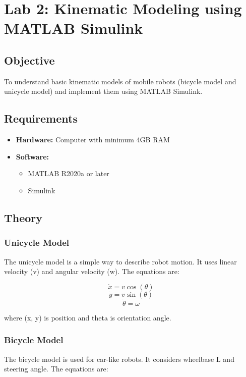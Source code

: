 \section{Lab 2: Kinematic Modeling using MATLAB Simulink}

\subsection{Objective}
To understand basic kinematic models of mobile robots (bicycle model and unicycle model) and implement them using MATLAB Simulink.

\subsection{Requirements}
\begin{itemize}
	\item \textbf{Hardware:} Computer with minimum 4GB RAM
	\item \textbf{Software:} 
	\begin{itemize}
		\item MATLAB R2020a or later
		\item Simulink
	\end{itemize}
\end{itemize}

\subsection{Theory}

\subsubsection{Unicycle Model}
The unicycle model is a simple way to describe robot motion. It uses linear velocity (v) and angular velocity (w). The equations are:

\begin{equation}
\dot{x} = v \cos(\theta)
\end{equation}
\begin{equation}
\dot{y} = v \sin(\theta)
\end{equation}
\begin{equation}
\dot{\theta} = \omega
\end{equation}

where (x, y) is position and theta is orientation angle.

\subsubsection{Bicycle Model}
The bicycle model is used for car-like robots. It considers wheelbase L and steering angle. The equations are:

